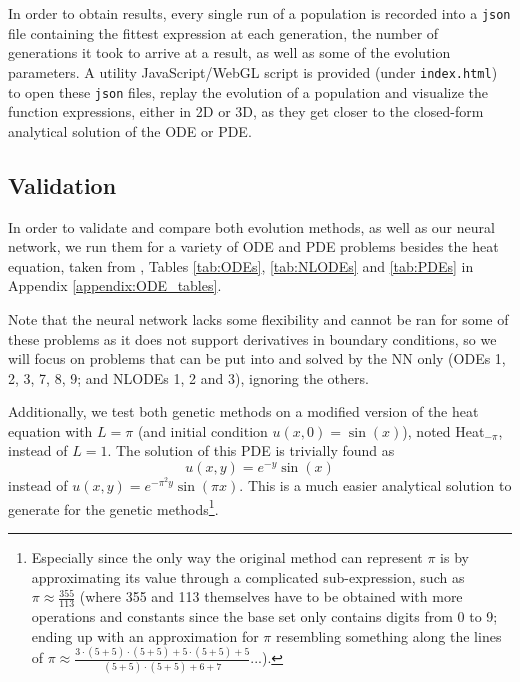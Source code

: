 \documentclass[aps,reprint,superscriptaddress,nofootinbib]{revtex4-2}
\begin{document}
In order to obtain results, every single run of a population is recorded into a \texttt{json} file containing the fittest expression at each generation, the number of generations it took to arrive at a result, as well as some of the evolution parameters. A utility JavaScript/WebGL script is provided (under \texttt{index.html}) to open these \texttt{json} files, replay the evolution of a population and visualize the function expressions, either in 2D or 3D, as they get closer to the closed-form analytical solution of the ODE or PDE.

\subsection{Validation}

In order to validate and compare both evolution methods, as well as our neural network, we run them for a variety of ODE and PDE problems besides the heat equation, taken from \cite{solving_diff_reproduce}, Tables \ref{tab:ODEs}, \ref{tab:NLODEs} and \ref{tab:PDEs} in Appendix \ref{appendix:ODE_tables}.

Note that the neural network lacks some flexibility and cannot be ran for some of these problems as it does not support derivatives in boundary conditions, so we will focus on problems that can be put into and solved by the NN only (ODEs 1, 2, 3, 7, 8, 9; and NLODEs 1, 2 and 3), ignoring the others.

Additionally, we test both genetic methods on a modified version of the heat equation with \(L = \pi\) (and initial condition \(u(x, 0) = \sin(x)\)), noted Heat\(_{-\pi}\), instead of \(L = 1\). The solution of this PDE is trivially found as
\begin{equation}\label{eq:new_heat}
    u(x,y) = e^{-y}\sin(x)
\end{equation}
instead of \(u(x,y) = e^{-\pi^2y}\sin(\pi x)\). This is a much easier analytical solution to generate for the genetic methods\footnote{Especially since the only way the original method can represent \(\pi\) is by approximating its value through a complicated sub-expression, such as \(\pi \approx \frac{355}{113}\) (where 355 and 113 themselves have to be obtained with more operations and constants since the base set only contains digits from 0 to 9; ending up with an approximation for \(\pi\) resembling something along the lines of \(\pi \approx \frac{3 \cdot (5+5) \cdot (5+5) + 5 \cdot (5+5) + 5}{(5+5) \cdot (5+5) + 6 + 7}\)...).}.
\end{document}
